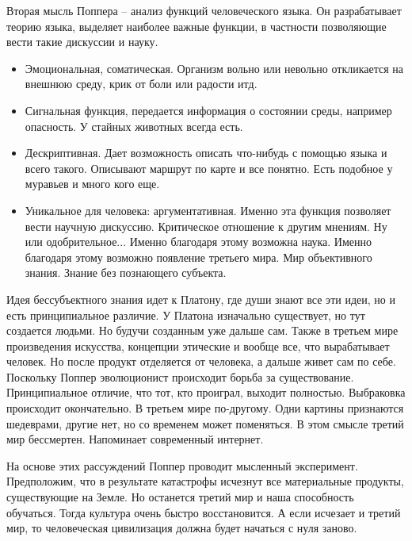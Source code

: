 \documentclass[a4paper, 12pt]{article}
\begin{document}
Вторая мысль Поппера -- анализ функций человеческого языка. Он 
разрабатывает теорию языка, выделяет наиболее важные функции, 
в частности позволяющие вести такие дискуссии и науку.
\begin{itemize}
  \item Эмоциональная, соматическая. Организм вольно или невольно 
    откликается на внешнюю среду, крик от боли или радости итд.
  \item Сигнальная функция, передается информация о состоянии среды, 
    например опасность. У стайных животных всегда есть.
  \item Дескриптивная. Дает возможность описать что-нибудь с помощью 
    языка и всего такого. Описывают маршрут по карте и все понятно. Есть 
    подобное у муравьев и много кого еще.
  \item Уникальное для человека: аргументативная. Именно эта функция 
    позволяет вести научную дискуссию. Критическое отношение к другим 
    мнениям. Ну или одобрительное... Именно благодаря этому возможна 
    наука. Именно благодаря этому возможно появление третьего мира. Мир 
    объективного знания. Знание без познающего субъекта.
\end{itemize}
Идея бессубъектного знания идет к Платону, где души знают все эти идеи, 
но и есть принципиальное различие. У Платона изначально существует, но 
тут создается людьми. Но будучи созданным уже дальше сам. Также 
в третьем мире произведения искусства, концепции этические и вообще все, 
что вырабатывает человек. Но после продукт отделяется от человека, 
а дальше живет сам по себе. Поскольку Поппер эволюционист происходит 
борьба за существование. Принципиальное отличие, что тот, кто проиграл, 
выходит полностью. Выбраковка происходит окончательно. В третьем мире 
по-другому. Одни картины признаются шедеврами, другие нет, но со 
временем может поменяться. В этом смысле третий мир бессмертен. 
Напоминает современный интернет.

На основе этих рассуждений Поппер проводит мысленный эксперимент. 
Предположим, что в результате катастрофы исчезнут все материальные 
продукты, существующие на Земле. Но останется третий мир и наша 
способность обучаться. Тогда культура очень быстро восстановится. А если 
исчезает и третий мир, то человеческая цивилизация должна будет начаться 
с нуля заново.
\end{document}
